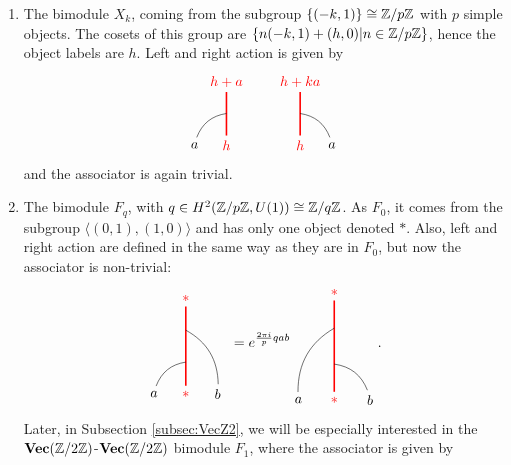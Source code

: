 	\begin{enumerate}
		\item The bimodule $X_k$, coming from the subgroup $\{(-k,1)\}\cong\mathbb{Z}/p\mathbb{Z}$ with $p$ simple objects. The cosets of this group are $\{n(-k,1)+(h,0)|n\in\mathbb{Z}/p\mathbb{Z}\}$, hence the object labels are $h$. Left and right action is given by 
			\begin{equation}
				\begin{tikzpicture}[scale=0.8,baseline=(current bounding box.center)]
				\node[red](m) at (0,0) {$h$};
				\node(b) at (-1,0) {$a$};
				\node[red](abm) at (0,2) {$h+a$};
				\draw[red,line width=0.4mm] (m)-- (abm);
				\draw (b) to [bend left] (0,1);
				\end{tikzpicture}\hspace{20pt}
				\begin{tikzpicture}[scale=0.8,baseline=(current bounding box.center)]
				\node[red](m) at (0,0) {$h$};
				\node(b) at (1,0) {$a$};
				\node[red](abm) at (0,2) {$h+ka$};
				\draw[red,line width=0.4mm] (m)-- (abm);
				\draw (b) to [bend right] (0,1);
				\end{tikzpicture}
			\end{equation}
		\noindent
		and the associator is again trivial.
		\item The bimodule $F_q$, with $q\in H^2(\mathbb{Z}/p\mathbb{Z},U(1))\cong\mathbb{Z}/q\mathbb{Z}$. As $F_0$, it comes from the subgroup $\langle(0,1),(1,0)\rangle$ and has only one object denoted $*$. Also, left and right action are defined in the same way as they are in $F_0$, but now the associator is non-trivial:
			\begin{equation}
				\begin{tikzpicture}[scale=0.8,baseline=(current bounding box.center)]
				\node[red](m) at (0,0) {$*$};
				\node(a) at (-1,0) {$a$};
				\node(b) at (1,0) {$b$};
				\node[red](abm) at (0,3) {$*$};
				\draw[red,line width=0.4mm] (m) -- (abm);
				\draw (a) to [bend left] (0,1);
				\draw (b) to [bend right] (0,2);
				\end{tikzpicture}\ =e^{\frac{2\pi i}{p}qab}
				\begin{tikzpicture}[scale=0.9,baseline=(current bounding box.center)]
				\node[red](m) at (0,0) {$*$};
				\node(a) at (-1,0) {$a$};
				\node(b) at (1,0) {$b$};
				\node[red](abm) at (0,3) {$*$};
				\draw[red,line width=0.4mm] (m) -- (abm);
				\draw (b) to [bend right] (0,1);
				\draw (a) to [bend left] (0,2);
				\end{tikzpicture}.
			\end{equation}
		Later, in Subsection \ref{subsec:VecZ2}, we will be especially interested in the $\textbf{Vec}(\mathbb{Z}/2\mathbb{Z})$-$\textbf{Vec}(\mathbb{Z}/2\mathbb{Z})$ bimodule $F_1$, where the associator is given by

\end{enumerate}
